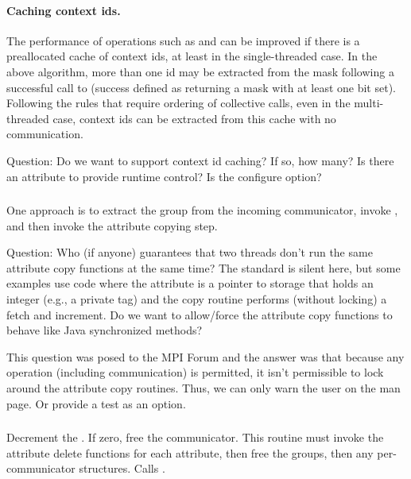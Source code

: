 \documentclass{article}
\begin{document}
\paragraph{Caching context ids.} 
The performance of operations such as  and
 can be improved if there is a preallocated cache of
context ids, at least in the single-threaded case.  In the above
algorithm, more than one id may be extracted from the mask following a
successful call to  (success defined as
returning a mask with at least one bit set).  Following the rules that
require ordering of collective calls, even in the multi-threaded case,
context ids can be extracted from this cache with no communication.

Question: Do we want to support context id caching?  If so, how many?
Is there an attribute to provide runtime control?  Is
 the configure option?

\subsubsection{}
One approach is to extract the group from the incoming communicator,
invoke , and then invoke the attribute
copying step.

Question: Who (if anyone) guarantees that two threads don't run the same
attribute copy functions at the same time?  The standard is silent here, but
some examples use code where the attribute is a pointer to storage that holds
an integer (e.g., a private tag) and the copy routine performs (without
locking) a fetch and increment.  Do we want to allow/force the attribute copy
functions to behave like Java synchronized methods?

This question was posed to the MPI Forum and the answer was that
because any operation (including communication) is permitted, it isn't
permissible to lock around the attribute copy routines.  Thus, we can
only warn the user on the man page.  Or provide a test as an option.

\subsubsection{}
Decrement the .  If zero, free the communicator.
This routine must invoke the attribute delete functions for each
attribute, then free the groups, then any per-communicator
structures.  Calls .
\end{document}
